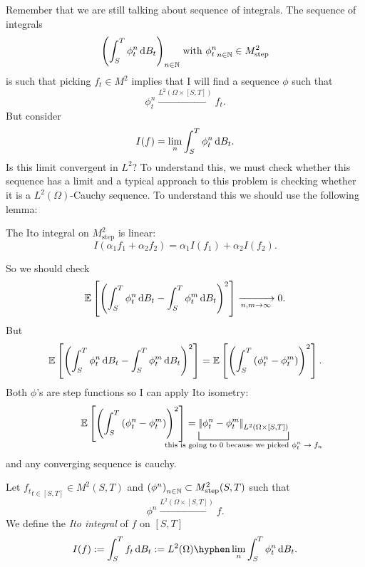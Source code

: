 \documentclass[crop=false, class=article]{standalone}
\begin{document}
Remember that we are still talking about sequence of integrals. The sequence of integrals
\begin{equation*}
	{\left(\int_S^T\phi_t^n\mathop{}\!\mathrm{d}B_{t}\right)}_{n\in\mathbb{N}}\;\text{with }{\phi_t^n}_{n\in\mathbb{N}}\in M^2_\mathrm{step}
\end{equation*}
is such that picking $f_t\in M^2$ implies that I will find a sequence $\phi$ such that
\begin{equation*}
	\phi_t^n\xrightarrow{L^2(\Omega\times[S,T])}f_t.
\end{equation*}
But consider
\begin{equation*}
	I(f)=\lim_{n}\int_S^T\phi_t^n\mathop{}\!\mathrm{d} B_{t}.
\end{equation*}
Is this limit convergent in $L^2$? To understand this, we must check whether this sequence has a limit and a typical approach to this problem is checking whether it is a $L^2(\Omega)$-Cauchy sequence. To understand this we should use the following lemma:
\begin{lemma}
	The Ito integral on $M^{2}_\mathrm{step}$ is linear:
	\begin{equation*}
		I(\alpha_1f_1+\alpha_2f_2)=\alpha_1I(f_1)+\alpha_2I(f_2).
	\end{equation*}
\end{lemma}
So we should check 
\begin{equation*}
	\mathbb{E}\left[\left(\int_{S}^T\phi_t^n\mathop{}\!\mathrm{d} B_{t}-\int_S^T\phi_t^m\mathop{}\!\mathrm{d} B_{t}\right)^2\right]\xrightarrow[n,m\to\infty]{}0.
\end{equation*}
But 
\begin{equation*}
		\mathbb{E}\left[\left(\int_{S}^T\phi_t^n\mathop{}\!\mathrm{d} B_{t}-\int_S^T\phi_t^m\mathop{}\!\mathrm{d} B_{t}\right)^2\right]=\mathbb{E}\left[\left(\int_S^T\left(\phi_t^n-\phi_t^m\right)\right)^2\right].
\end{equation*}
Both $\phi$'s are  step functions so I can apply Ito isometry:
\begin{equation*}
	\ev\left[\left(\int_S^T\left(\phi_t^n-\phi_t^m\right)\right)^2\right]=\underbracket[0.6pt][8pt]{\norm{\phi_t^n-\phi_t^m}_{L^2(\Omega\times[S,T])}}_{\mathclap{\text{this is going to 0 because we picked $\phi^n_t\to f_n$}}}
\end{equation*}
and any converging sequence is cauchy.
\begin{definition}
	Let ${f_t}_{t\in[S,T]}\in M^2(S,T)$ and ${(\phi^n)}_{n\in\mathbb{N}}\subset M^2_\mathrm{step}(S,T)$ such that 
	\begin{equation*}
		\phi^n\xrightarrow{L^2(\Omega\times[S,T])}f.
	\end{equation*}
	We define the \emph{Ito integral} of $f$ on $[S,T]$
	\begin{equation*}
		I(f):=\int_S^Tf_t\dbt:=L^2(\Omega)\hyphen\lim_{n}\int_S^T\phi_t^n\dbt.
	\end{equation*}
\end{definition}
\end{document}

